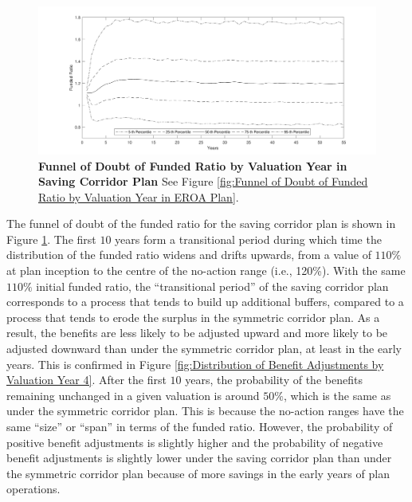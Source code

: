 \documentclass{sfuthesis}
\numberwithin{equation}{chapter}
\begin{document}
		\begin{figure}[H]
			\includegraphics[width=1\linewidth]{ResultPlot/FR3.pdf} 
			\caption[Funnel of Doubt of Funded Ratio by Valuation Year in Saving Corridor Plan]{\textbf{Funnel of Doubt of Funded Ratio by Valuation Year in Saving Corridor Plan}
			\vspace{-0.4cm}
			\newline\footnotesize\justify See Figure \ref{fig:Funnel of Doubt of Funded Ratio by Valuation Year in EROA Plan}.}
			\label{fig:Funnel of Doubt of Funded Ratio by Valuation Year in Saving Corridor Plan}
		\end{figure}
	    
	    \justify
		The funnel of doubt of the funded ratio for the saving corridor plan is shown in Figure \ref{fig:Funnel of Doubt of Funded Ratio by Valuation Year in Saving Corridor Plan}. The first $10$ years form a transitional period during which time the distribution of the funded ratio widens and drifts upwards, from a value of $110\%$ at plan inception to the centre of the no-action range (i.e., 120\%). With the same $110\%$ initial funded ratio, the ``transitional period'' of the saving corridor plan corresponds to a process that tends to build up additional buffers, compared to a process that tends to erode the surplus in the symmetric corridor plan. As a result, the benefits are less likely to be adjusted upward and more likely to be adjusted downward than under the symmetric corridor plan, at least in the early years. This is confirmed in Figure \ref{fig:Distribution of Benefit Adjustments by Valuation Year 4}. After the first $10$ years, the probability of the benefits remaining unchanged in a given valuation is around $50\%$, which is the same as under the symmetric corridor plan. This is because the no-action ranges have the same ``size'' or ``span'' in terms of the funded ratio. However, the probability of positive benefit adjustments is slightly higher and the probability of negative benefit adjustments is slightly lower under the saving corridor plan than under the symmetric corridor plan because of more savings in the early years of plan operations.
		
\end{document}
